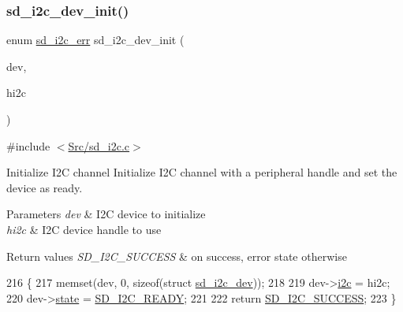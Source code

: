 \subsubsection{\texorpdfstring{sd\+\_\+i2c\+\_\+dev\+\_\+init()}{sd\_i2c\_dev\_init()}}
{\footnotesize\ttfamily enum \mbox{\hyperlink{group___s_d___i2_c___types_gae1e3131e61bdef08371262ffb4948a04}{sd\+\_\+i2c\+\_\+err}} sd\+\_\+i2c\+\_\+dev\+\_\+init (\begin{DoxyParamCaption}\item[{struct \mbox{\hyperlink{structsd__i2c__dev}{sd\+\_\+i2c\+\_\+dev}} $\ast$}]{dev,  }\item[{I2\+C\+\_\+\+Handle\+Type\+Def $\ast$}]{hi2c }\end{DoxyParamCaption})\hspace{0.3cm}{\ttfamily [static]}}



{\ttfamily \#include $<$\mbox{\hyperlink{sd__i2c_8c}{Src/sd\+\_\+i2c.\+c}}$>$}



Initialize I2C channel Initialize I2C channel with a peripheral handle and set the device as ready. 


\begin{DoxyParams}{Parameters}
{\em dev} & I2C device to initialize \\
\hline
{\em hi2c} & I2C device handle to use \\
\hline
\end{DoxyParams}

\begin{DoxyRetVals}{Return values}
{\em S\+D\+\_\+\+I2\+C\+\_\+\+S\+U\+C\+C\+E\+SS} & on success, error state otherwise \\
\hline
\end{DoxyRetVals}

\begin{DoxyCode}
216 \{
217     memset(dev, 0, \textcolor{keyword}{sizeof}(\textcolor{keyword}{struct} \mbox{\hyperlink{structsd__i2c__dev}{sd\_i2c\_dev}}));
218     
219     dev->\mbox{\hyperlink{structsd__i2c__dev_a23e125244a7e27ff9ccc31b3b8495cfe}{i2c}} = hi2c;
220     dev->\mbox{\hyperlink{structsd__i2c__dev_a98f804dd76a5f720aeed34756d2142e4}{state}} = \mbox{\hyperlink{group___s_d___i2_c___types_ggaf9254fee305a19fcc68f616121146552a521415eae27441855ada6fa17d0f32fe}{SD\_I2C\_READY}};
221     
222     \textcolor{keywordflow}{return} \mbox{\hyperlink{group___s_d___i2_c___types_ggae1e3131e61bdef08371262ffb4948a04a8ac753d592892daa8d2f9109c59b884b}{SD\_I2C\_SUCCESS}};
223 \}
\end{DoxyCode}
\mbox{\label{group___s_d___i2_c___functions_ga813c9280ce6745a2e55bccc9d562cd54}} 

